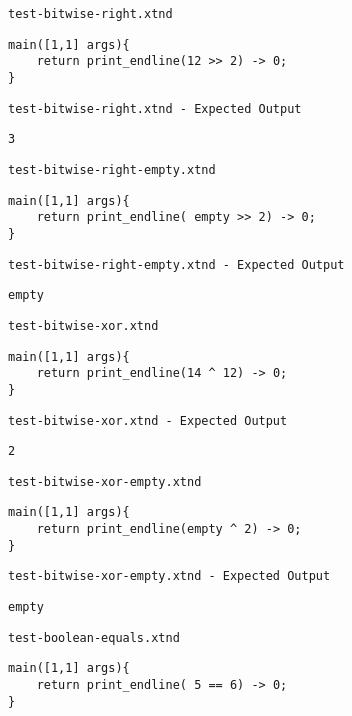 \medskip \noindent \texttt{test-bitwise-right.xtnd}


\begin{lstlisting}
main([1,1] args){
	return print_endline(12 >> 2) -> 0;
}
\end{lstlisting}


\medskip \noindent \texttt{test-bitwise-right.xtnd - Expected Output}


\begin{lstlisting}
3
\end{lstlisting}


\medskip \noindent \texttt{test-bitwise-right-empty.xtnd}


\begin{lstlisting}
main([1,1] args){
	return print_endline( empty >> 2) -> 0;
}
\end{lstlisting}


\medskip \noindent \texttt{test-bitwise-right-empty.xtnd - Expected Output}


\begin{lstlisting}
empty
\end{lstlisting}


\medskip \noindent \texttt{test-bitwise-xor.xtnd}


\begin{lstlisting}
main([1,1] args){
	return print_endline(14 ^ 12) -> 0;
}
\end{lstlisting}


\medskip \noindent \texttt{test-bitwise-xor.xtnd - Expected Output}


\begin{lstlisting}
2
\end{lstlisting}


\medskip \noindent \texttt{test-bitwise-xor-empty.xtnd}


\begin{lstlisting}
main([1,1] args){
	return print_endline(empty ^ 2) -> 0;
}
\end{lstlisting}


\medskip \noindent \texttt{test-bitwise-xor-empty.xtnd - Expected Output}


\begin{lstlisting}
empty
\end{lstlisting}


\medskip \noindent \texttt{test-boolean-equals.xtnd}


\begin{lstlisting}
main([1,1] args){
	return print_endline( 5 == 6) -> 0;
}
\end{lstlisting}



